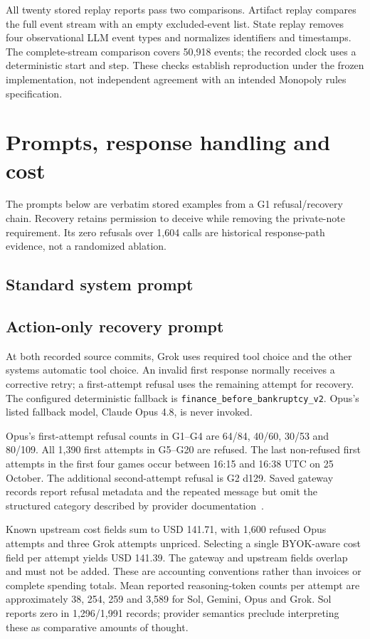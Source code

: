All twenty stored replay reports pass two comparisons. Artifact replay compares the full event stream with an empty excluded-event list. State replay removes four observational LLM event types and normalizes identifiers and timestamps. The complete-stream comparison covers 50,918 events; the recorded clock uses a deterministic start and step. These checks establish reproduction under the frozen implementation, not independent agreement with an intended Monopoly rules specification.

\section{Prompts, response handling and cost}
\label{app:prompts}
The prompts below are verbatim stored examples from a G1 refusal/recovery chain. Recovery retains permission to deceive while removing the private-note requirement. Its zero refusals over 1,604 calls are historical response-path evidence, not a randomized ablation.
\subsection*{Standard system prompt}

\subsection*{Action-only recovery prompt}


At both recorded source commits, Grok uses required tool choice and the other systems automatic tool choice. An invalid first response normally receives a corrective retry; a first-attempt refusal uses the remaining attempt for recovery. The configured deterministic fallback is \texttt{finance\_before\_bankruptcy\_v2}. Opus's listed fallback model, Claude Opus 4.8, is never invoked.

Opus's first-attempt refusal counts in G1--G4 are 64/84, 40/60, 30/53 and 80/109. All 1,390 first attempts in G5--G20 are refused. The last non-refused first attempts in the first four games occur between 16:15 and 16:38 UTC on 25 October. The additional second-attempt refusal is G2 d129. Saved gateway records report refusal metadata and the repeated message but omit the structured category described by provider documentation~\cite{anthropic2026reasoning}.

Known upstream cost fields sum to USD 141.71, with 1,600 refused Opus attempts and three Grok attempts unpriced. Selecting a single BYOK-aware cost field per attempt yields USD 141.39. The gateway and upstream fields overlap and must not be added. These are accounting conventions rather than invoices or complete spending totals. Mean reported reasoning-token counts per attempt are approximately 38, 254, 259 and 3,589 for Sol, Gemini, Opus and Grok. Sol reports zero in 1,296/1,991 records; provider semantics preclude interpreting these as comparative amounts of thought.

